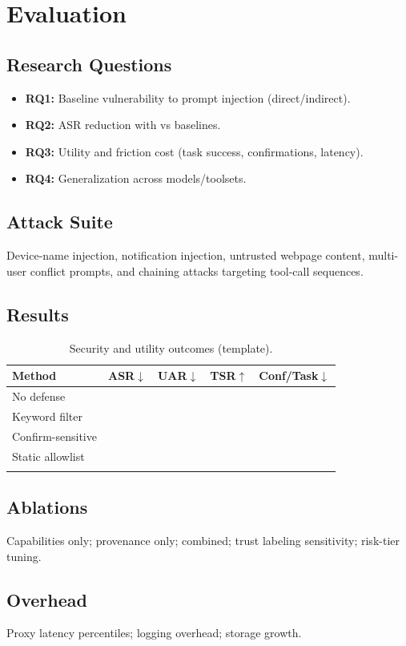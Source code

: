 \section{Evaluation}
\label{sec:eval}

\subsection{Research Questions}
\begin{itemize}[leftmargin=1.2em]
  \item \textbf{RQ1:} Baseline vulnerability to prompt injection (direct/indirect).
  \item \textbf{RQ2:} ASR reduction with \sys{} vs baselines.
  \item \textbf{RQ3:} Utility and friction cost (task success, confirmations, latency).
  \item \textbf{RQ4:} Generalization across models/toolsets.
\end{itemize}

\subsection{Attack Suite}
Device-name injection, notification injection, untrusted webpage content, multi-user conflict prompts,
and chaining attacks targeting tool-call sequences.

\subsection{Results}
\begin{table}[t]
\centering
\caption{Security and utility outcomes (template).}
\label{tab:provsafe_main}
\begin{tabular}{lrrrr}
\toprule
Method & ASR$\downarrow$ & UAR$\downarrow$ & TSR$\uparrow$ & Conf/Task$\downarrow$ \\
\midrule
No defense &  &  &  &  \\
Keyword filter &  &  &  &  \\
Confirm-sensitive &  &  &  &  \\
Static allowlist &  &  &  &  \\
\sys{} &  &  &  &  \\
\bottomrule
\end{tabular}
\end{table}

\subsection{Ablations}
Capabilities only; provenance only; combined; trust labeling sensitivity; risk-tier tuning.

\subsection{Overhead}
Proxy latency percentiles; logging overhead; storage growth.

